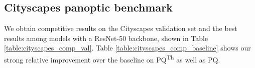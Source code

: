 \documentclass[10pt,twocolumn,letterpaper]{article}
\begin{document}
\subsection{Cityscapes panoptic benchmark}
We obtain competitive results on the Cityscapes validation set and the best results among models with a ResNet-50 backbone, shown in Table \ref{table:cityscapes_comp_val}. Table \ref{table:cityscapes_comp_baseline} shows our strong relative improvement over the baseline on PQ\textsuperscript{Th} as well as PQ. 
\begin{table}[!htp]
\centering
\vspace{0.05cm}
\vspace{-2mm}
\vspace{-2mm}
\caption{\textbf{Comparison to our implementation of Panoptic FPN \cite{kirillov2019panoptic} baseline model on the Cityscapes \textit{val} dataset}. All results are based on a ResNet-50 backbone.}
\label{table:cityscapes_comp_baseline}
\vspace{-0mm}
\end{table}
\end{document}
